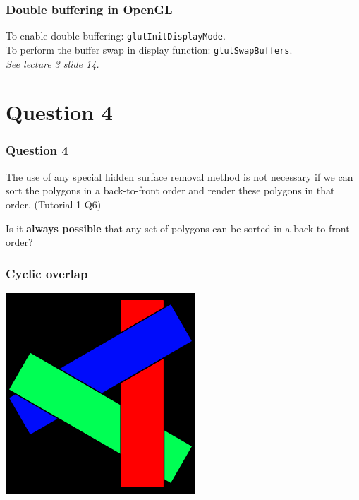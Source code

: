 \documentclass{beamer}
\begin{document}
\begin{frame}
    \frametitle{Double buffering in OpenGL}

    To enable double buffering: \texttt{glutInitDisplayMode}.\\

    To perform the buffer swap in display function: \texttt{glutSwapBuffers}.\\

    \textit{See lecture 3 slide 14.}

\end{frame}

\section{Question 4}

\begin{frame}
    \frametitle{Question 4}
    The use of any special hidden surface removal method is not necessary if we can sort the polygons in a back-to-front order 
    and render these polygons in that order. (Tutorial 1 Q6)\\

    \vspace{1em}
    
    Is it \textbf{always possible} that any set of polygons can be sorted in a back-to-front order?
\end{frame}

\begin{frame}
    \frametitle{Cyclic overlap}

    \begin{center}
        \includegraphics[scale=0.6]{cyclic-overlap.png}
    \end{center}

\end{frame}
\end{document}
